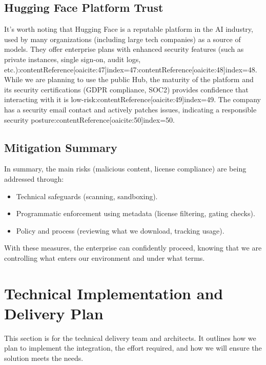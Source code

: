 \documentclass{article}
\begin{document}
\subsection*{Hugging Face Platform Trust}
It’s worth noting that Hugging Face is a reputable platform in the AI industry, used by many organizations (including large tech companies) as a source of models. They offer enterprise plans with enhanced security features (such as private instances, single sign-on, audit logs, etc.):contentReference[oaicite:47]{index=47}:contentReference[oaicite:48]{index=48}. While we are planning to use the public Hub, the maturity of the platform and its security certifications (GDPR compliance, SOC2) provides confidence that interacting with it is low-risk:contentReference[oaicite:49]{index=49}. The company has a security email contact and actively patches issues, indicating a responsible security posture:contentReference[oaicite:50]{index=50}.

\subsection*{Mitigation Summary}
In summary, the main risks (malicious content, license compliance) are being addressed through:
\begin{itemize}
    \item Technical safeguards (scanning, sandboxing).
    \item Programmatic enforcement using metadata (license filtering, gating checks).
    \item Policy and process (reviewing what we download, tracking usage).
\end{itemize}
With these measures, the enterprise can confidently proceed, knowing that we are controlling what enters our environment and under what terms.

\section{Technical Implementation and Delivery Plan}
This section is for the technical delivery team and architects. It outlines how we plan to implement the integration, the effort required, and how we will ensure the solution meets the needs.
\end{document}
